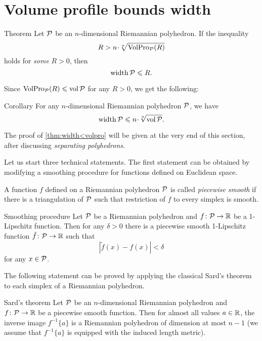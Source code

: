 \section{Volume profile bounds width}

\begin{thm}{Theorem}\label{thm:width<volpro}
Let $\mathcal{P}$ be an $n$-dimensional Riemannian polyhedron. 
If the inequality 
\[R> n\cdot \sqrt[n]{\VolPro_{\spc{P}}(R)}\]
holds for {}\emph{some} $R>0$, then 
\[\operatorname{\rm width}\nolimits\mathcal{P}\leqslant  R.\]
\end{thm}

Since $\operatorname{\rm VolPro}\nolimits_{\mathcal{P}}(R)\leqslant \operatorname{\rm vol}\nolimits\mathcal{P}$ for any $R>0$,
we get the following:

\begin{thm}{Corollary}\label{thm:width<vol}
For any $n$-dimensional Riemannian polyhedron $\mathcal{P}$, we have
\[\width\spc{P}\le n\cdot \sqrt[n]{\vol\spc{P}}.\]

\end{thm}

The proof of \ref{thm:width<volpro} will be given at the very end of this section,
after discussing {}\emph{separating polyhedrons}. 

Let us start three technical statements.
The first statement can be obtained by modifying a smoothing procedure for functions defined on Euclidean space. 

A function $f$ defined on a Riemannian polyhedron $\mathcal{P}$ is called \emph{piecewise smooth} if there is a triangulation of $\mathcal{P}$ such that restriction of $f$ to every simplex is smooth.


\begin{thm}{Smoothing procedure}\label{smoothing-procedure}
Let $\mathcal{P}$ be a Riemannian polyhedron and $f\colon\mathcal{P}\to \mathbb{R}$ be a 1-Lipschitz function.
Then for any $\delta>0$ there is a piecewise smooth 1-Lipschitz function $\tilde f\colon\mathcal{P}\to \mathbb{R}$ such that 
\[|\tilde f(x)-f(x)|<\delta\]
for any $x\in  \mathcal{P}$.
\end{thm}

The following statement can be proved by applying the classical Sard's theorem to each simplex of a Riemannian polyhedron.

\begin{thm}{Sard's theorem}\label{sard}
Let $\mathcal{P}$ be an $n$-dimensional Riemannian polyhedron and $f\colon\mathcal{P}\to \mathbb{R}$ be a piecewise smooth function.
Then for almost all values $a\in\mathbb{R}$, the inverse image $f^{-1}\{a\}$  is a Riemannian polyhedron of dimension at most $n-1$ (we assume that $f^{-1}\{a\}$ is equipped with the induced length metric).
\end{thm}

